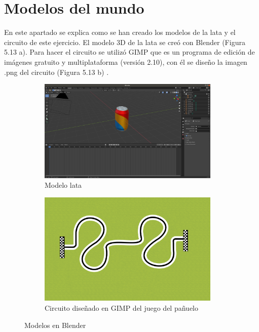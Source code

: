 \section{Modelos del mundo}
En este apartado se explica como se han creado los modelos de la lata y el circuito de este ejercicio.
El modelo 3D de la lata se creó con Blender (Figura 5.13 a). Para hacer el circuito se utilizó  GIMP que es un programa de edición de imágenes gratuito y multiplataforma (versión 2.10), con él se diseño la imagen .png del circuito (Figura 5.13 b) .
 
\begin{figure}[H]
  \begin{subfigure}[b]{0.5\textwidth}
  \centering
    \includegraphics[width=0.95\textwidth, height=0.6\textwidth]{chapters/images/lata.png}
    \caption{Modelo lata}
    \label{fig:f1}
  \end{subfigure}
  \hfill
  \begin{subfigure}[b]{0.5\textwidth}
  \centering
     \includegraphics[width=0.95\textwidth, height=0.6\textwidth]{chapters/images/handkerchief.png}
     \caption{Circuito diseñado en GIMP del juego del pañuelo} 
    \label{fig:f2}
 
  \end{subfigure}
  \caption{Modelos en Blender}
\end{figure}
 
